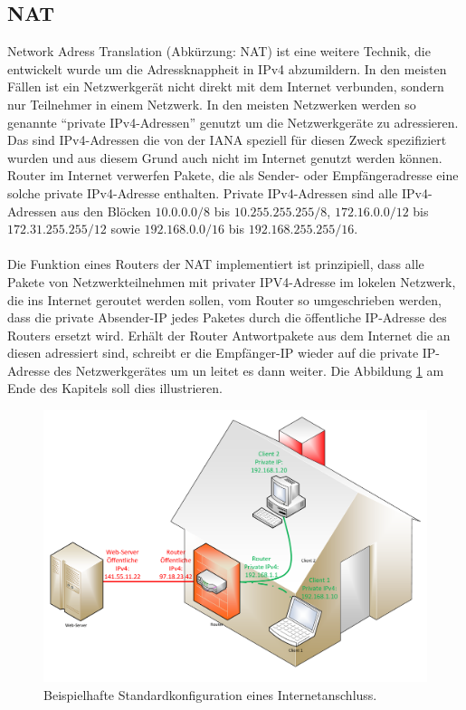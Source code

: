 \documentclass[a4paper,12pt]{scrartcl}
\begin{document}
\subsection{NAT}
Network Adress Translation (Abk\"urzung: NAT) \cite[RFC1631]{RFC1631} ist eine weitere Technik, die entwickelt wurde um die Adressknappheit in IPv4 abzumildern. In den meisten F\"allen ist ein Netzwerkger\"at nicht direkt mit dem Internet verbunden, sondern nur Teilnehmer in einem Netzwerk. In den meisten Netzwerken werden so genannte "`private IPv4-Adressen"' genutzt um die Netzwerkger\"ate zu adressieren. Das sind IPv4-Adressen die von der IANA speziell f\"ur diesen Zweck spezifiziert wurden und aus diesem Grund auch nicht im Internet genutzt werden k\"onnen. Router im Internet verwerfen Pakete, die als Sender- oder Empf\"angeradresse eine solche private IPv4-Adresse enthalten. Private IPv4-Adressen sind alle IPv4-Adressen aus den Bl\"ocken $10.0.0.0/8$ bis $10.255.255.255/8$, $172.16.0.0/12$ bis $172.31.255.255/12$ sowie $192.168.0.0/16$ bis $192.168.255.255/16$. \\
\\
Die Funktion eines Routers der NAT implementiert ist prinzipiell, dass alle Pakete von Netzwerkteilnehmen mit privater IPV4-Adresse im lokelen Netzwerk, die ins Internet geroutet werden sollen, vom Router so umgeschrieben werden, dass die private Absender-IP jedes Paketes durch die \"offentliche IP-Adresse des Routers ersetzt wird. Erh\"alt der Router Antwortpakete aus dem Internet die an diesen adressiert sind, schreibt er die Empf\"anger-IP wieder auf die private IP-Adresse des Netzwerkger\"ates um un leitet es dann weiter. Die Abbildung \ref{stdinetv4} am Ende des Kapitels soll dies illustrieren.\\

\begin{figure}[htb]
\begin{center}
 \includegraphics[width=1\hsize]{./Zeichnungen/IPv4NAT.pdf}
 \end{center}
\caption[Beispielhafte Standardkonfiguration eines Internetanschluss mit NAT, Quelle: Autor, verwendete Symbole unterliegen der
GPL]{\label{stdinetv4}Beispielhafte Standardkonfiguration eines Internetanschluss.}
\end{figure}
\end{document}
